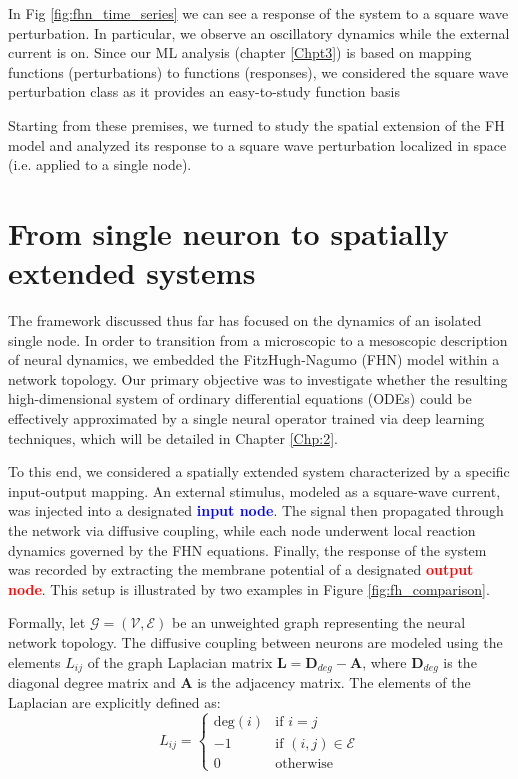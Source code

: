 In Fig \ref{fig:fhn_time_series} we can see a response of the system to a square wave perturbation. In particular, we observe an oscillatory dynamics while the external current is on.
Since our ML analysis (chapter \ref{Chpt3}) is based on mapping  functions (perturbations) to functions (responses), we considered the square wave perturbation class as it provides an easy-to-study function basis

Starting from these premises, we turned to study the spatial extension of the FH model and analyzed its response to a square wave perturbation localized in space (i.e. applied to a single node).


\newpage
\section{From single neuron to spatially extended systems}
\label{sec:extended_network}
The framework discussed thus far has focused on the dynamics of an isolated single node. In order to transition from a microscopic to a mesoscopic description of neural dynamics, we embedded the FitzHugh-Nagumo (FHN) model within a network topology. Our primary objective was to investigate whether the resulting high-dimensional system of ordinary differential equations (ODEs) could be effectively approximated by a single neural operator trained via deep learning techniques, which will be detailed in Chapter \ref{Chp:2}.

To this end, we considered a spatially extended system characterized by a specific input-output mapping. An external stimulus, modeled as a square-wave current, was injected into a designated \textcolor{blue}{\textbf{input node}}. The signal then propagated through the network via diffusive coupling, while each node underwent local reaction dynamics governed by the FHN equations. Finally, the response of the system was recorded by extracting the membrane potential of a designated \textcolor{red}{\textbf{output node}}. This setup is illustrated by two examples in Figure \ref{fig:fh_comparison}.


Formally, let $\mathcal{G} = (\mathcal{V}, \mathcal{E})$ be an unweighted graph representing the neural network topology. The diffusive coupling between neurons are modeled using the elements $L_{ij}$ of the graph Laplacian matrix $\mathbf{L} = \mathbf{D}_{deg} - \mathbf{A}$, where $\mathbf{D}_{deg}$ is the diagonal degree matrix and $\mathbf{A}$ is the adjacency matrix. The elements of the Laplacian are explicitly defined as:
\begin{equation}
L_{ij} = 
\begin{cases} 
\text{deg}(i) & \text{if } i = j \\
-1 & \text{if } (i,j) \in \mathcal{E} \\
0 & \text{otherwise}
\end{cases}
\end{equation}

